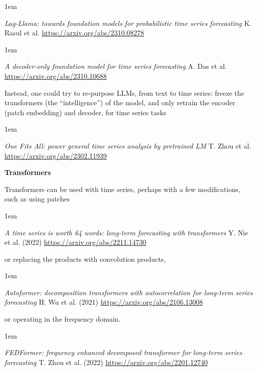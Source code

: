 \documentclass[a5paper]{article}
\newenvironment{reference}{%
  \medskip\goodbreak
  \parskip 0pt
  \raggedright
  \leftskip 1em
  \obeylines
}{\par\medskip\goodbreak}
\def\subsection#1{{\par\bigskip\goodbreak\large\bfseries #1\par}}
\begin{document}
\begin{reference}
  \emph{Lag-Llama: towards foundation models for probabilistic time series forecasting}
  K. Rasul et al.
  \url{https://arxiv.org/abs/2310.08278}
\end{reference}

\begin{reference}
  \emph{A decoder-only foundation model for time series forecasting}
  A. Das et al.
  \url{https://arxiv.org/abs/2310.10688}
\end{reference}

Instead, one could try to re-purpose LLMs, from text to time series:
freeze the transformers (the ``intelligence'') of the model,
and only retrain the encoder (patch embedding) and decoder, for time series tasks

\begin{reference}
  \emph{One Fits All: power general time series analysis by pretrained LM}
  T. Zhou et al.
  \url{https://arxiv.org/abs/2302.11939}
\end{reference}

\subsection{Transformers}

Transformers can be used with time series, perhaps with a few modifications, such as
using patches 

\begin{reference}
  \emph{A time series is worth 64 words: long-term forecasting with transformers}
  Y. Nie et al. (2022)
  \url{https://arxiv.org/abs/2211.14730}
\end{reference}

or replacing the products with convolution products, 

\begin{reference}
  \emph{Autoformer: decomposition transformers with autocorrelation for long-term series forecasting}
  H. Wu et al. (2021)
  \url{https://arxiv.org/abs/2106.13008}
\end{reference}

or operating in the frequency domain.

\begin{reference}
  \emph{FEDFormer: frequency enhanced decomposed transformer for long-term series forecasting}
  T. Zhou et al. (2022)
  \url{https://arxiv.org/abs/2201.12740}
\end{reference}
\end{document}
